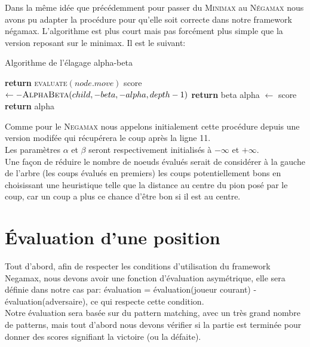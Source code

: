 \documentclass{article}
\begin{document}
\pagebreak
Dans la même idée que précédemment pour passer du \textsc{Minimax} au \textsc{Négamax} nous avons pu adapter la procédure pour qu'elle soit correcte dans
notre framework négamax. L'algorithme est plus court mais pas forcément plus simple que la version reposant sur le minimax. Il est le suivant:\\
\begin{algorithm}
\caption{Algorithme de l'élagage alpha-beta}\label{negamax}
\begin{algorithmic}[1]
		\State \textbf{return} \textsc{evaluate}$(node.move)$
	\EndIf
		\State score $\gets -\textsc{AlphaBeta}(child,-beta, -alpha, depth -1)$
			\State \textbf{return} beta
		\EndIf
			\State alpha $\gets$ score
		\EndIf
	\EndFor
	\State \textbf{return} alpha
\EndProcedure
\end{algorithmic}
\end{algorithm}

Comme pour le \textsc{Negamax} nous appelons initialement cette procédure depuis une version modifée qui récupérera le coup après la ligne 11.\\
Les paramètres $\alpha$ et $\beta$ seront respectivement initialisés à $-\infty$ et $+\infty$.\\
Une façon de réduire le nombre de noeuds évalués serait de considérer à la gauche de l'arbre (les coups évalués en premiers) les coups potentiellement
bons en choisissant une heuristique telle que la distance au centre du pion posé par le coup, car un coup a plus ce chance d'être bon si il est au centre.

\pagebreak
\section{Évaluation d'une position}

Tout d'abord, afin de respecter les conditions d'utilisation du framework Negamax, nous devons avoir une fonction d'évaluation asymétrique, elle sera définie
dans notre cas par: évaluation = évaluation(joueur courant) - évaluation(adversaire), ce qui respecte cette condition.\\
Notre évaluation sera basée sur du pattern matching, avec un très grand nombre de patterns, mais tout d'abord nous devons vérifier si la partie est terminée
pour donner des scores signifiant la victoire (ou la défaite).
\end{document}
